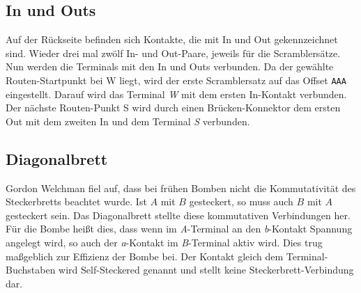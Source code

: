 \subsection{In und Outs}\label{subsec:in_und_out}
Auf der Rückseite befinden sich Kontakte, die mit \glqq In\grqq{} und \glqq Out\grqq{} gekennzeichnet sind.
Wieder drei mal zwölf In- und Out-Paare, jeweils für die Scramblersätze.
Nun werden die Terminals mit den In und Outs verbunden.
Da der gewählte Routen-Startpunkt bei \glqq W\grqq{} liegt, wird der erste Scramblersatz auf das Offset \texttt{AAA} eingestellt.
Darauf wird das Terminal \emph{W} mit dem ersten In-Kontakt verbunden.
Der nächste Routen-Punkt \glqq S\grqq{} wird durch einen \glqq Brücken-Konnektor\grqq{} dem ersten Out mit dem zweiten In und dem Terminal \emph{S} verbunden.

\subsection{Diagonalbrett}\label{subsec:diagonalboard}
Gordon Welchman fiel auf, dass bei frühen Bomben nicht die Kommutativität des Steckerbretts beachtet wurde.
Ist $A$ mit $B$ gesteckert, so muss auch $B$ mit $A$ gesteckert sein.
Das Diagonalbrett stellte diese kommutativen Verbindungen her.
Für die Bombe heißt dies, dass wenn im \emph{A}-Terminal an den \emph{b}-Kontakt Spannung angelegt wird,
so auch der \emph{a}-Kontakt im \emph{B}-Terminal aktiv wird.
Dies trug maßgeblich zur Effizienz der Bombe bei.
Der Kontakt gleich dem Terminal-Buchstaben wird \glqq Self-Steckered\grqq{} genannt und stellt keine Steckerbrett-Verbindung dar.

